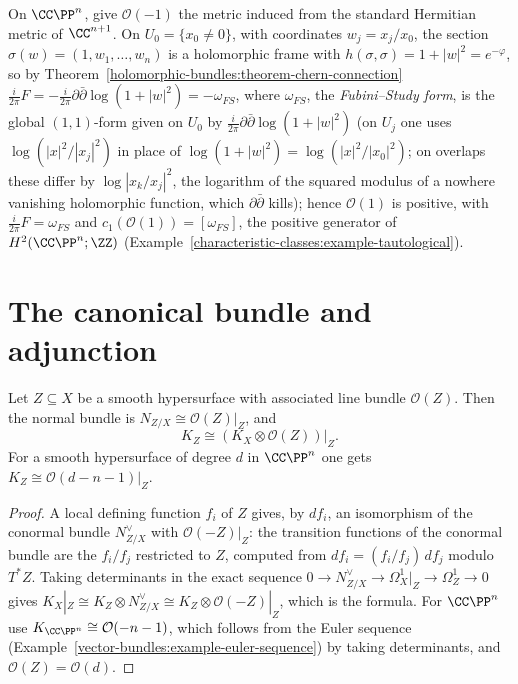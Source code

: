 \begin{example}\label{holomorphic-bundles:example-fubini-study}
On $\CC\PP^n$, give $\mathcal{O}(-1)$ the metric induced from the standard Hermitian metric of $\CC^{n+1}$. On $U_0 = \{x_0 \neq 0\}$, with coordinates $w_j = x_j/x_0$, the section
$\sigma(w) = (1, w_1, \ldots, w_n)$ is a holomorphic frame with $h(\sigma, \sigma) = 1 + |w|^2 = e^{-\varphi}$, so by Theorem~\ref{holomorphic-bundles:theorem-chern-connection}
$\frac{i}{2\pi}F = -\frac{i}{2\pi}\partial\bar\partial\log(1 + |w|^2) = -\omega_{FS}$, where $\omega_{FS}$, the \emph{Fubini--Study form}, is the global $(1,1)$-form given on $U_0$ by
$\frac{i}{2\pi}\partial\bar\partial\log(1 + |w|^2)$ (on $U_j$ one uses $\log(|x|^2/|x_j|^2)$ in place of $\log(1 + |w|^2) = \log(|x|^2/|x_0|^2)$; on overlaps these differ by $\log|x_k/x_j|^2$, the logarithm of the squared modulus of a nowhere
vanishing holomorphic function, which $\partial\bar\partial$ kills); hence
$\mathcal{O}(1)$ is positive, with $\frac{i}{2\pi}F = \omega_{FS}$ and $c_1(\mathcal{O}(1)) = [\omega_{FS}]$, the positive generator of $H^2(\CC\PP^n; \ZZ)$
(Example~\ref{characteristic-classes:example-tautological}).
\end{example}

\section{The canonical bundle and adjunction}\label{holomorphic-bundles:section-adjunction}

\begin{proposition}[Adjunction]\label{holomorphic-bundles:proposition-adjunction}
Let $Z \subseteq X$ be a smooth hypersurface with associated line bundle $\mathcal{O}(Z)$. Then the normal bundle is $N_{Z/X} \cong \mathcal{O}(Z)|_Z$, and
\[
K_Z \cong \left(K_X \otimes \mathcal{O}(Z)\right)\big|_Z .
\]
For a smooth hypersurface of degree $d$ in $\CC\PP^n$ one gets $K_Z \cong \mathcal{O}(d - n - 1)|_Z$.
\end{proposition}

\begin{proof}
A local defining function $f_i$ of $Z$ gives, by $df_i$, an isomorphism of the conormal bundle $N^\vee_{Z/X}$ with $\mathcal{O}(-Z)|_Z$: the transition functions of the conormal bundle are the
$f_i/f_j$ restricted to $Z$, computed from $df_i = (f_i/f_j)\,df_j$ modulo $T^*Z$. Taking determinants in the exact sequence
$0 \to N^\vee_{Z/X} \to \Omega^1_X|_Z \to \Omega^1_Z \to 0$ gives $K_X|_Z \cong K_Z \otimes N^\vee_{Z/X} \cong K_Z \otimes \mathcal{O}(-Z)|_Z$, which is the formula. For $\CC\PP^n$ use
$K_{\CC\PP^n} \cong \mathcal{O}(-n-1)$, which follows from the Euler sequence (Example~\ref{vector-bundles:example-euler-sequence}) by taking determinants, and $\mathcal{O}(Z) = \mathcal{O}(d)$.
\end{proof}

